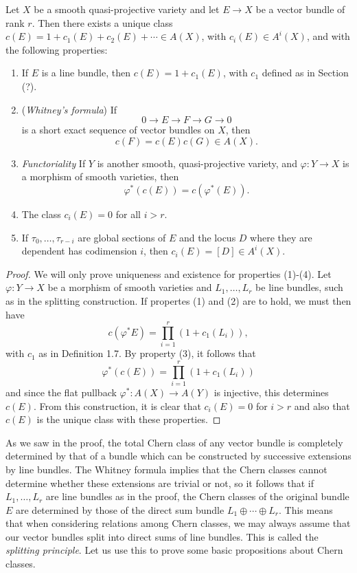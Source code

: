\documentclass[a4paper,openany]{scrbook}
\begin{document}
\begin{thm}
Let $X$ be a smooth quasi-projective variety and let $E\to X$ be a vector bundle of rank $r$. Then there exists a unique class $c(E)=1+c_1(E)+c_2(E)+\cdots\in A(X)$, with $c_i(E)\in A^i(X)$, and with the following properties:\begin{enumerate}
    \item If $E$ is a line bundle, then $c(E)=1+c_1(E)$, with $c_1$ defined as in Section (?).
    \item (\textit{Whitney's formula}) If 
    $$0\to E\to F\to G\to 0$$
    is a short exact sequence of vector bundles on $X$, then
    $$c(F)=c(E)c(G)\in A(X).$$
    \item \textit{Functoriality} If $Y$ is another smooth, quasi-projective variety, and $\varphi:Y\to X$ is a morphism of smooth varieties, then 
    $$\varphi^*(c(E))=c(\varphi^*(E)).$$
    \item The class $c_i(E)=0$ for all $i>r$.
    \item If $\tau_0,\ldots,\tau_{r-i}$ are global sections of $E$ and the locus $D$ where they are dependent has codimension $i$, then $c_i(E)=[D]\in A^i(X)$.
\end{enumerate}
\end{thm}

\begin{proof}
We will only prove uniqueness and existence for properties (1)-(4). Let $\varphi:Y\to X$ be a morphism of smooth varieties and $L_1,\ldots, L_r$ be line bundles, such as in the splitting construction. If propertes (1) and (2) are to hold, we must then have
$$c(\varphi^*E)=\prod_{i=1}^r (1+c_1(L_i)),$$
with $c_1$ as in Definition 1.7. By property (3), it follows that 
$$\varphi^*(c(E))=\prod_{i=1}^r (1+c_1(L_i))$$
and since the flat pullback $\varphi^*:A(X)\to A(Y)$ is injective, this determines $c(E)$. From this construction, it is clear that $c_i(E)=0$ for $i>r$ and also that $c(E)$ is the unique class with these properties.

\end{proof}

As we saw in the proof, the total Chern class of any vector bundle is completely determined by that of a bundle which can be constructed by successive extensions by line bundles. The Whitney formula implies that the Chern classes cannot determine whether these extensions are trivial or not, so it follows that if $L_1,\ldots, L_r$ are line bundles as in the proof, the Chern classes of the original bundle $E$ are determined by those of the direct sum bundle $L_1\oplus\cdots\oplus L_r$. This means that when considering relations among Chern classes, we may always assume that our vector bundles split into direct sums of line bundles. This is called the \textit{splitting principle}. Let us use this to prove some basic propositions about Chern classes. 
\end{document}
